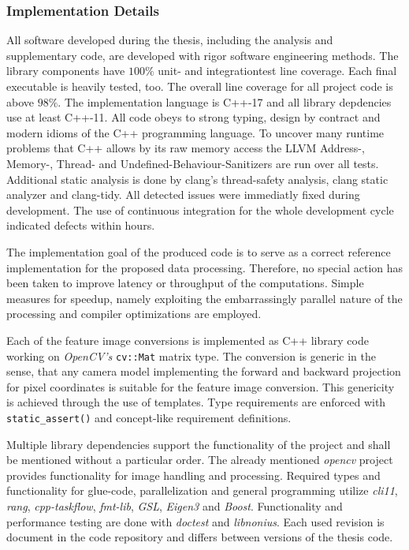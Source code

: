 \subsubsection{Implementation Details}

All software developed during the thesis, including the analysis and supplementary code, are developed with rigor software engineering methods.
The library components have $100\%$ unit- and integrationtest line coverage.
Each final executable is heavily tested, too.
The overall line coverage for all project code is above $98\%$.
The implementation language is C++-17\cite{c++17} and all library depdencies use at least C++-11\cite{c++11}.
All code obeys to strong typing, design by contract\cite{meyer_ieee1992} and modern idioms of the C++ programming language\cite{stroustrup_cpppl2013}.
To uncover many runtime problems that C++ allows by its raw memory access the LLVM Address-, Memory-, Thread- and Undefined-Behaviour-Sanitizers\cite{google_sanitizers} are run over all tests.
Additional static analysis is done by clang's thread-safety analysis\cite{clang_thread_safety}, clang static analyzer\cite{clang_static_analysis} and clang-tidy\cite{babati2017static}.
All detected issues were immediatly fixed during development.
The use of continuous integration\cite{fowler_ci2000} for the whole development cycle indicated defects within hours.

The implementation goal of the produced code is to serve as a correct reference implementation for the proposed data processing.
Therefore, no special action has been taken to improve latency or throughput of the computations.
Simple measures for speedup, namely exploiting the embarrassingly parallel nature of the processing and compiler optimizations are employed.

Each of the feature image conversions is implemented as C++ library code working on \emph{OpenCV's} \lstinline[basicstyle=\ttfamily]|cv::Mat| matrix type.
The conversion is generic in the sense, that any camera model implementing the forward and backward projection for pixel coordinates is suitable for the feature image conversion.
This genericity is achieved through the use of templates.
Type requirements are enforced with \lstinline[basicstyle=\ttfamily]|static_assert()| and concept-like\cite{c++concepts} requirement definitions.

Multiple library dependencies support the functionality of the project and shall be mentioned without a particular order.
The already mentioned \emph{opencv}\cite{opencv_library} project provides functionality for image handling and processing. 
Required types and functionality for glue-code, parallelization and general programming utilize \emph{cli11}\cite{cli11}, \emph{rang}\cite{rang}, \emph{cpp-taskflow}\cite{Huang2019CppTaskflowFT}, \emph{fmt-lib}\cite{fmtlib}, \emph{GSL}\cite{gsl}, \emph{Eigen3}\cite{eigenweb} and \emph{Boost}\cite{boost}.
Functionality and performance testing are done with \emph{doctest}\cite{doctest} and \emph{libnonius}\cite{libnonius}.
Each used revision is document in the code repository and differs between versions of the thesis code.
